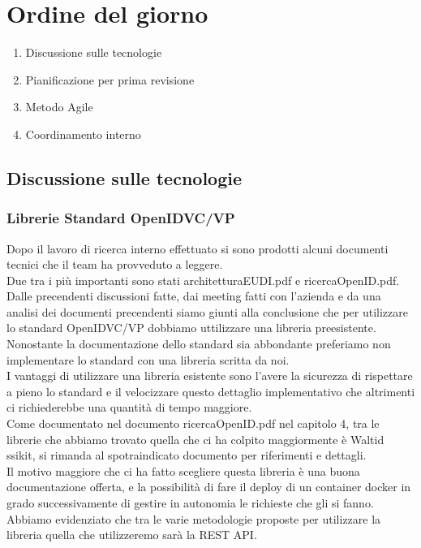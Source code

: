 \section{Ordine del giorno}
\begin{enumerate}
\item Discussione sulle tecnologie 
\item Pianificazione per prima revisione
\item Metodo Agile
\item Coordinamento interno 
\end{enumerate}

\subsection{Discussione sulle tecnologie}
\subsubsection{Librerie Standard OpenIDVC/VP}
Dopo il lavoro di ricerca interno effettuato si sono prodotti alcuni documenti tecnici che il team ha provveduto a leggere.\\
Due tra i più importanti sono stati architetturaEUDI.pdf e ricercaOpenID.pdf.\\
Dalle precendenti discussioni fatte, dai meeting fatti con l'azienda e da una analisi dei documenti precendenti siamo giunti alla 
conclusione che per utilizzare lo standard OpenIDVC/VP dobbiamo uttilizzare una libreria preesistente.\\
Nonostante la documentazione dello standard sia abbondante preferiamo non implementare lo standard con una libreria scritta da noi.\\
I vantaggi di utilizzare una libreria esistente sono l'avere la sicurezza di rispettare a pieno lo standard e il velocizzare questo dettaglio implementativo che altrimenti ci richiederebbe una quantità di tempo maggiore.\\
Come documentato nel documento ricercaOpenID.pdf nel capitolo 4, tra le librerie che abbiamo trovato quella che ci ha colpito maggiormente è
Waltid ssikit, si rimanda al spotraindicato documento per riferimenti e dettagli.\\
Il motivo maggiore che ci ha fatto scegliere questa libreria è una buona documentazione offerta, e la possibilità di fare il deploy di un container docker in grado successivamente di
gestire in autonomia le richieste che gli si fanno.\\
Abbiamo evidenziato che tra le varie metodologie proposte per utilizzare la libreria quella che utilizzeremo sarà la REST API.
